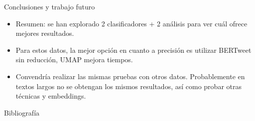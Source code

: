 \documentclass[final]{beamer}
\newlength{\onecolwid}
\begin{document}
\begin{frame}[t]
\begin{columns}[t]
\begin{column}{\onecolwid}




\begin{alertblock}{Conclusiones y trabajo futuro} 
 
    \begin{itemize}
    \item Resumen: se han explorado \alert{2 clasificadores + 2 análisis} para ver cuál ofrece mejores resultados.
    \item Para estos datos, la mejor opción en cuanto a precisión es utilizar BERTweet sin reducción, UMAP mejora tiempos.
    \item Convendría realizar las mismas pruebas con otros datos. Probablemente en textos largos no se obtengan los mismos resultados, así como probar otras técnicas y embeddings.
    \end{itemize}

\end{alertblock}

\begin{block}{\small Bibliografía}
\footnotesize


\end{block}




\end{column} %

\end{columns} %

\end{frame} %
\end{document}
